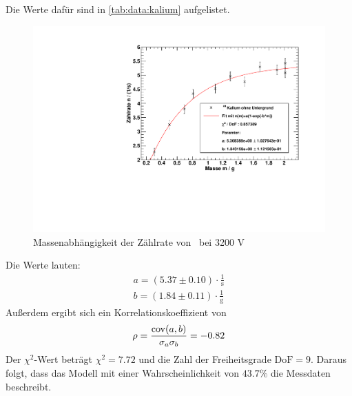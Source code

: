 Die Werte dafür sind in \autoref{tab:data:kalium} aufgelistet.
 
\begin{figure}[H]
\begin{center}
  \includegraphics[width=15cm]{../img/Kalium40_Massenabhaengigkeit.pdf}
  \caption[Massenabhängigkeit der Zählrate von \kalium]{Massenabhängigkeit der Zählrate von \kalium\, bei 3200 V}
  \label{img:kalium:massdep}
\end{center}
\end{figure}
Die Werte lauten:
\begin{gather}
  a = (5.37 \pm 0.10) \cdot \frac{1}{\text{s}} \\
  b = (1.84 \pm 0.11) \cdot \frac{1}{\text{g}} 
\end{gather}
Außerdem ergibt sich ein Korrelationskoeffizient von
\begin{equation}
  \rho = \frac{\operatorname{cov}(a, b)}{\sigma_a \sigma_b} = -0.82
\end{equation}
Der $\chi^2$-Wert beträgt $\chi^2 =7.72$ und die Zahl der Freiheitsgrade $\text{DoF} = 9$. Daraus folgt, dass das Modell mit einer 
Wahrscheinlichkeit von $43.7\%$ die Messdaten beschreibt.

